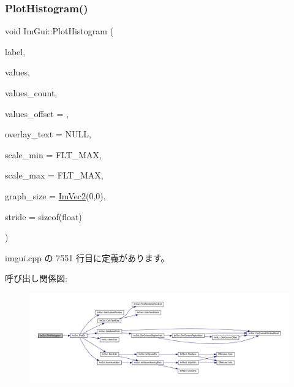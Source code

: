 \subsubsection{\texorpdfstring{Plot\+Histogram()}{PlotHistogram()}\hspace{0.1cm}{\footnotesize\ttfamily [1/2]}}
{\footnotesize\ttfamily void Im\+Gui\+::\+Plot\+Histogram (\begin{DoxyParamCaption}\item[{const char $\ast$}]{label,  }\item[{const float $\ast$}]{values,  }\item[{int}]{values\+\_\+count,  }\item[{int}]{values\+\_\+offset = {},  }\item[{const char $\ast$}]{overlay\+\_\+text = {\ttfamily NULL},  }\item[{float}]{scale\+\_\+min = {\ttfamily FLT\+\_\+MAX},  }\item[{float}]{scale\+\_\+max = {\ttfamily FLT\+\_\+MAX},  }\item[{\mbox{\hyperlink{struct_im_vec2}{Im\+Vec2}}}]{graph\+\_\+size = {\ttfamily \mbox{\hyperlink{struct_im_vec2}{Im\+Vec2}}(0,0)},  }\item[{int}]{stride = {\ttfamily sizeof(float)} }\end{DoxyParamCaption})}



 imgui.\+cpp の 7551 行目に定義があります。

呼び出し関係図\+:\nopagebreak
\begin{figure}[H]
\begin{center}
\leavevmode
\includegraphics[width=350pt]{namespace_im_gui_af7a92b2118981835b5251bfdaac50252_cgraph}
\end{center}
\end{figure}
\mbox{\label{namespace_im_gui_af8089203baf8cf723a158c9e34bda2a4}} 

